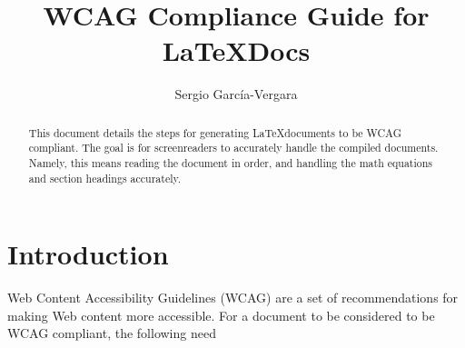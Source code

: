 \documentclass{llncs}
\begin{document}
% 


\title{WCAG Compliance Guide for \LaTeX Docs }

\author{Sergio Garc\'{i}a-Vergara}


\maketitle




\begin{abstract}
  This document details the steps for generating \LaTeX documents to be WCAG
  compliant. The goal is for screenreaders to accurately handle the compiled
  documents. Namely, this means reading the document in order, and handling the
  math equations and section headings accurately.


\end{abstract}



\section{Introduction}

Web Content Accessibility Guidelines (WCAG) are a set of recommendations for
making Web content more accessible. For a document to be considered to be WCAG
compliant, the following need
\end{document}
